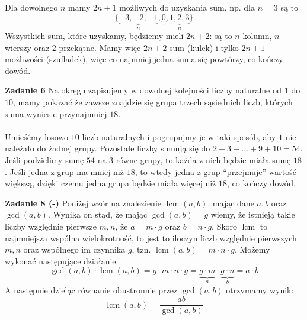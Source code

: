 \documentclass[a4paper,12pt]{article}
\DeclareMathOperator{\lcm}{lcm}
\begin{document}
\noindent Dla dowolnego $n$ mamy $2n+1$ możliwych do uzyskania sum, np. dla $n = 3$ są to 
$$\{ \underbrace{-3, -2, -1}_{n}, \underbrace{0}_{1}, \underbrace{1, 2, 3}_{n}\}$$
Wszystkich sum, które uzyskamy, będziemy mieli $2n+2$: są to $n$ kolumn, $n$ wierszy oraz $2$ przekątne. Mamy więc $2n+2$ sum (kulek) i tylko $2n+1$ możliwości (szufladek), więc co najmniej jedna suma się powtórzy, co kończy dowód.

\newpage
\noindent \textbf{Zadanie 6} \newline
Na okręgu zapisujemy w dowolnej kolejności liczby naturalne od $1$ do $10$, mamy pokazać że zawsze znajdzie się grupa trzech sąsiednich liczb, których suma wyniesie przynajmniej $18$. \\ \\

\noindent Umieśćmy losowo $10$ liczb naturalnych i pogrupujmy je w taki sposób, aby $1$ nie należało do żadnej grupy. Pozostałe liczby sumują się do $2+3+\dots+9+10=54$. Jeśli podzielimy sumę $54$ na $3$ równe grupy, to każda z nich będzie miała sumę $18$. Jeśli jedna z grup ma mniej niż $18$, to wtedy jedna z grup ``przejmuje'' wartość większą, dzięki czemu jedna grupa będzie miała więcej niż $18$, co kończy dowód.

\noindent \newline \textbf{Zadanie 8 (-)} \newline
Poniżej wzór na znalezienie $\lcm(a,b)$, mając dane $a, b$ oraz $\gcd(a,b)$. Wynika on stąd, że mając $\gcd(a,b)=g$ wiemy, że istnieją takie liczby względnie pierwsze $m, n$, że $a = m\cdot g$ oraz $b = n \cdot g$. Skoro $\lcm$ to najmniejsza wspólna wielokrotność, to jest to iloczyn liczb względnie pierwszych $m, n$ oraz wspólnego im czynnika $g$, tzn. $\lcm(a,b)=m\cdot n \cdot g$. Możemy wykonać następujące działanie:
$$ \gcd(a,b) \cdot \lcm(a,b) = g \cdot m\cdot n \cdot g = \underbrace{g\cdot m}_{a} \cdot \underbrace{g \cdot n}_{b} = a \cdot b$$ 
A następnie dzieląc równanie obustronnie przez $\gcd(a,b)$ otrzymamy wynik:
$$ \lcm(a,b) = \frac{ab}{\gcd(a,b)} $$
\end{document}

